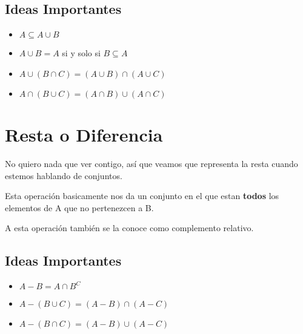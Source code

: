 \documentclass[12pt, fleqn]{report}                             %
\begin{document}
            \subsection{Ideas Importantes}

                \begin{itemize}
                    \item $A \subseteq A \cup B$

                    \item $A \cup B = A$ si y solo si $B \subseteq A$

                    \item $A \cup (B \cap C) = (A \cup B) \cap (A \cup C)$

                    \item $A \cap (B \cup C) = (A \cap B) \cup (A \cap C)$
                \end{itemize}




        \clearpage
        \section{Resta o Diferencia}

            No quiero nada que ver contigo, así que veamos que representa la resta cuando estemos
            hablando de conjuntos.
            \begin{equation*}
            \end{equation*}

            Esta operación basicamente nos da un conjunto en el que estan \textbf{todos} los elementos
            de A que no pertenezcen a B.

            A esta operación también se la conoce como complemento relativo.

            \subsection{Ideas Importantes}

                \begin{itemize}
                    \item $A - B = A \cap B^C$

                    \item $A - (B \cup C) = (A - B) \cap (A - C)$

                    \item $A - (B \cap C) = (A - B) \cup (A - C)$

                \end{itemize}
\end{document}
